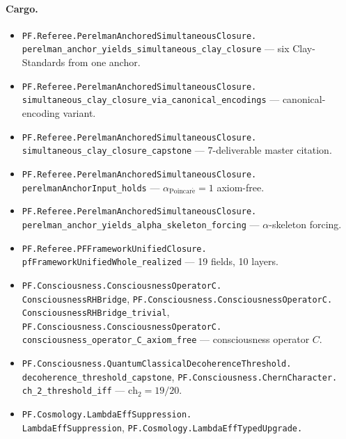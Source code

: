 \documentclass[11pt,a4paper]{article}
\theoremstyle{plain}
\theoremstyle{definition}
\begin{document}
\paragraph{Cargo.}
\begin{itemize}[leftmargin=*,nosep]
\item \texttt{PF.Referee.PerelmanAnchoredSimultaneousClosure.\\
  perelman\_anchor\_yields\_simultaneous\_clay\_closure}
  --- six Clay-Standards from one anchor.
\item \texttt{PF.Referee.PerelmanAnchoredSimultaneousClosure.\\
  simultaneous\_clay\_closure\_via\_canonical\_encodings}
  --- canonical-encoding variant.
\item \texttt{PF.Referee.PerelmanAnchoredSimultaneousClosure.\\
  simultaneous\_clay\_closure\_capstone}
  --- 7-deliverable master citation.
\item \texttt{PF.Referee.PerelmanAnchoredSimultaneousClosure.\\
  perelmanAnchorInput\_holds}
  --- $\alpha_{\mathrm{Poincar\acute e}} = 1$ axiom-free.
\item \texttt{PF.Referee.PerelmanAnchoredSimultaneousClosure.\\
  perelman\_anchor\_yields\_alpha\_skeleton\_forcing}
  --- $\alpha$-skeleton forcing.
\item \texttt{PF.Referee.PFFrameworkUnifiedClosure.\\
  pfFrameworkUnifiedWhole\_realized}
  --- 19 fields, 10 layers.
\item \texttt{PF.Consciousness.ConsciousnessOperatorC.\\
  ConsciousnessRHBridge},
  \texttt{PF.Consciousness.ConsciousnessOperatorC.\\
  ConsciousnessRHBridge\_trivial},
  \texttt{PF.Consciousness.ConsciousnessOperatorC.\\
  consciousness\_operator\_C\_axiom\_free}
  --- consciousness operator $C$.
\item \texttt{PF.Consciousness.QuantumClassicalDecoherenceThreshold.\\
  decoherence\_threshold\_capstone},
  \texttt{PF.Consciousness.ChernCharacter.\\
  ch\_2\_threshold\_iff}
  --- $\mathrm{ch}_{2} = 19/20$.
\item \texttt{PF.Cosmology.LambdaEffSuppression.\\
  LambdaEffSuppression},
  \texttt{PF.Cosmology.LambdaEffTypedUpgrade.\\
}
\end{itemize}
\end{document}
